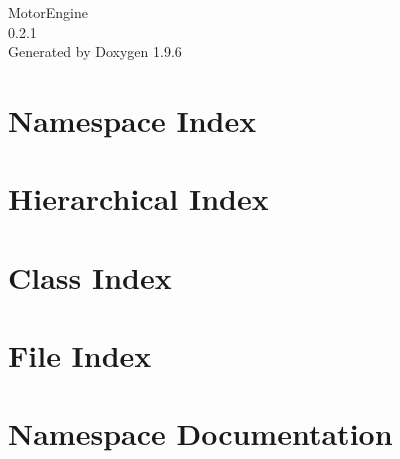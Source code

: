 \documentclass[twoside]{book}
\newcommand{\+}{\discretionary{\mbox{\scriptsize$\hookleftarrow$}}{}{}}
\newcommand{\clearemptydoublepage}{%
    \newpage{\pagestyle{empty}\cleardoublepage}%
  }
\begin{document}
  \raggedbottom
    \hypersetup{pageanchor=false,
                bookmarksnumbered=true,
                pdfencoding=unicode
               }
  \begin{titlepage}
  \vspace*{7cm}
  \begin{center}%
  {\Large Motor\+Engine}\\
  [1ex]\large 0.\+2.\+1 \\
  \vspace*{1cm}
  {\large Generated by Doxygen 1.9.6}\\
  \end{center}
  \end{titlepage}
  \clearemptydoublepage
  \tableofcontents
  \clearemptydoublepage
  \hypersetup{pageanchor=true}
\chapter{Namespace Index}

\chapter{Hierarchical Index}

\chapter{Class Index}

\chapter{File Index}

\chapter{Namespace Documentation}





\end{document}
